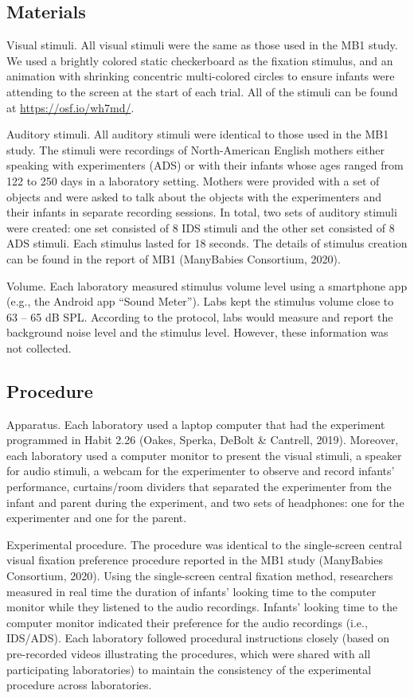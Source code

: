 \documentclass[
  ,man,floatsintext]{apa6}
\begin{document}
\hypertarget{materials}{%
\subsection{Materials}\label{materials}}

Visual stimuli. All visual stimuli were the same as those used in the MB1 study. We used a brightly colored static checkerboard as the fixation stimulus, and an animation with shrinking concentric multi-colored circles to ensure infants were attending to the screen at the start of each trial. All of the stimuli can be found at \url{https://osf.io/wh7md/}.

Auditory stimuli. All auditory stimuli were identical to those used in the MB1 study. The stimuli were recordings of North-American English mothers either speaking with experimenters (ADS) or with their infants whose ages ranged from 122 to 250 days in a laboratory setting. Mothers were provided with a set of objects and were asked to talk about the objects with the experimenters and their infants in separate recording sessions. In total, two sets of auditory stimuli were created: one set consisted of 8 IDS stimuli and the other set consisted of 8 ADS stimuli. Each stimulus lasted for 18 seconds. The details of stimulus creation can be found in the report of MB1 (ManyBabies Consortium, 2020).

Volume. Each laboratory measured stimulus volume level using a smartphone app (e.g., the Android app ``Sound Meter''). Labs kept the stimulus volume close to 63 -- 65 dB SPL. According to the protocol, labs would measure and report the background noise level and the stimulus level. However, these information was not collected.

\hypertarget{procedure}{%
\subsection{Procedure}\label{procedure}}

Apparatus. Each laboratory used a laptop computer that had the experiment programmed in Habit 2.26 (Oakes, Sperka, DeBolt \& Cantrell, 2019). Moreover, each laboratory used a computer monitor to present the visual stimuli, a speaker for audio stimuli, a webcam for the experimenter to observe and record infants' performance, curtains/room dividers that separated the experimenter from the infant and parent during the experiment, and two sets of headphones: one for the experimenter and one for the parent.

Experimental procedure. The procedure was identical to the single-screen central visual fixation preference procedure reported in the MB1 study (ManyBabies Consortium, 2020). Using the single-screen central fixation method, researchers measured in real time the duration of infants' looking time to the computer monitor while they listened to the audio recordings. Infants' looking time to the computer monitor indicated their preference for the audio recordings (i.e., IDS/ADS). Each laboratory followed procedural instructions closely (based on pre-recorded videos illustrating the procedures, which were shared with all participating laboratories) to maintain the consistency of the experimental procedure across laboratories.
\end{document}
